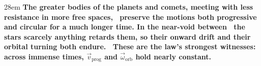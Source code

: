 \documentclass[border=4pt]{standalone}
\begin{document}
\begin{varwidth}{28em}
\large\bfseries
The greater bodies of the planets and comets, meeting with less resistance in more free spaces, \     preserve the motions both progressive and circular for a much longer time. In the near-void between \     the stars scarcely anything retards them, so their onward drift and their orbital turning both endure. \     These are the law's strongest witnesses: across immense times, $\vec{v}_{\text{prog}}$ and $\vec{\omega}_{\text{orb}}$ hold nearly constant.
\end{varwidth}
\end{document}
